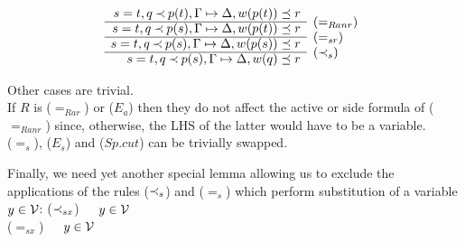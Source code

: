 \begin{PROOF}
\begin{LS}
\[ \begin{array}{rl}
s=t, q\Incl p(t), \GSD, w(p(t))\preceq r \\ \cline{1-1}
s=t, q\Incl p(s), \GSD, w(p(t))\preceq r & \rabove{(=_{Ranr})} \\ \cline{1-1}
s=t, q\Incl p(s), \GSD, w(p(s))\preceq r & \rabove{(=_{sr})} \\ \cline{1-1}
s=t, q\Incl p(s), \GSD, w(q)\preceq r & \rabove{(\Incl_s)} \end{array} \]
%
\item Other cases are trivial. \\
If $R$ is ($=_{Rar}$) or ($E_a$) then they do not affect the active or side
formula of ($=_{Ranr}$) since, otherwise, the LHS of the latter would have to
be a variable. \\
 ($=_s$), ($E_s$) and ($Sp.cut$) can be trivially swapped.
\end{LS}
\end{PROOF}

Finally, we need yet another special lemma allowing us to exclude the 
applications of the rules ($\mathbin{\prec}_s$) and ($=_s$) which perform substitution of a variable $y\in{\cal V}$:
\label{ru:inclsx} ($\mathbin{\prec}_{sx}$)\ \
\ $y\in{\cal V}$ \\
\label{ru:eqsx} ($=_{sx}$)\ \
\ $y\in{\cal V}$

